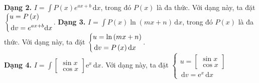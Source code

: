 \textbf{Dạng 2.} $I = \displaystyle\int {P\left( x \right){e^{ax + b}}{\mathrm{\,d}}x} $, trong đó $P\left(x\right)$ là đa thức.  
Với dạng này, ta đặt $\left\{\begin{aligned} 	& u=P\left(x\right) \\  	&  \mathrm{\,d}v={e}^{ax+b} \mathrm{d}x \\  \end{aligned}\right.$.
\textbf{Dạng 3.} $I=\displaystyle\int{P\left(x\right)\ln \left(mx+n\right) \mathrm{\,d}x}$, trong đó $P\left(x\right)$ là đa thức.
Với dạng này, ta đặt  $\left\{\begin{aligned} 	& u=\ln \left(mx+n\right) \\  	&  \mathrm{\,d}v=P\left(x\right) \mathrm{d}x \\  \end{aligned}\right.$.\\
\textbf{Dạng 4.} $I = \displaystyle\int {\left[ \begin{array}{l} 	\sin x\\  	\cos x 	\end{array} \right]{\mathrm{e}^x}\mathrm{\,d}x} $. Với dạng này, ta đặt $\left\{ \begin{array}{l}
u = \left[ \begin{array}{l}
\sin x\\
\cos x
\end{array} \right]\\
\mathrm{\,d}v = {\mathrm{e}^x}\mathrm{\,d}x
\end{array} \right.$

